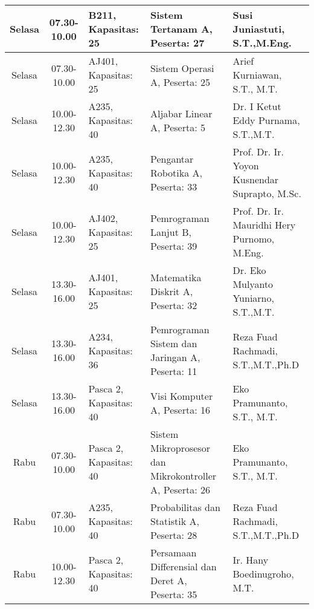 \begin{longtable}[c]{|c|c|>{\centering\arraybackslash}m{2.5cm}|>{\centering\arraybackslash}m{4cm}|>{\centering\arraybackslash}m{3.2cm}|}
    Selasa & 07.30-10.00 & B211, Kapasitas: 25    & Sistem Tertanam A, \linebreak Peserta: 27                           & Susi Juniastuti, S.T.,M.Eng.                  \\ \hline
    Selasa & 07.30-10.00 & AJ401, Kapasitas: 25   & Sistem Operasi A, \linebreak Peserta: 25                            & Arief Kurniawan, S.T., M.T.                   \\ \hline
    Selasa & 10.00-12.30 & A235, Kapasitas: 40    & Aljabar Linear A, \linebreak Peserta: 5                             & Dr. I Ketut Eddy Purnama, S.T.,M.T.           \\ \hline
    Selasa & 10.00-12.30 & A235, Kapasitas: 40    & Pengantar Robotika A, \linebreak Peserta: 33                        & Prof. Dr. Ir. Yoyon Kusnendar Suprapto, M.Sc. \\ \hline
    Selasa & 10.00-12.30 & AJ402, Kapasitas: 25   & Pemrograman Lanjut B, \linebreak Peserta: 39                        & Prof. Dr. Ir. Mauridhi Hery Purnomo, M.Eng.   \\ \hline
    Selasa & 13.30-16.00 & AJ401, Kapasitas: 25   & Matematika Diskrit A, \linebreak Peserta: 32                        & Dr. Eko Mulyanto Yuniarno, S.T.,M.T.          \\ \hline
    Selasa & 13.30-16.00 & A234, Kapasitas: 36    & Pemrograman Sistem dan Jaringan A, \linebreak Peserta: 11           & Reza Fuad Rachmadi, S.T.,M.T.,Ph.D            \\ \hline
    Selasa & 13.30-16.00 & Pasca 2, Kapasitas: 40 & Visi Komputer A, \linebreak Peserta: 16                             & Eko Pramunanto, S.T., M.T.                    \\ \hline
    Rabu   & 07.30-10.00 & Pasca 2, Kapasitas: 40 & Sistem Mikroprosesor dan Mikrokontroller A, \linebreak Peserta: 26  & Eko Pramunanto, S.T., M.T.                    \\ \hline
    Rabu   & 07.30-10.00 & A235, Kapasitas: 40    & Probabilitas dan Statistik A, \linebreak Peserta: 28                & Reza Fuad Rachmadi, S.T.,M.T.,Ph.D            \\ \hline
    Rabu   & 10.00-12.30 & Pasca 2, Kapasitas: 40 & Persamaan Differensial dan Deret A, \linebreak Peserta: 35          & Ir. Hany Boedinugroho, M.T.                   \\ \hline

\end{longtable}
